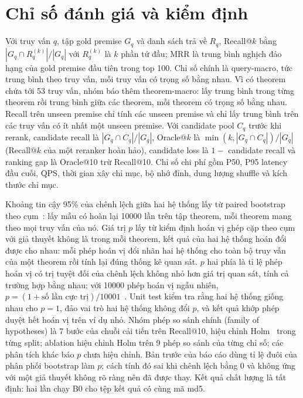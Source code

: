 \documentclass[11pt,a4paper,oneside]{report}
\begin{document}
\section{Chỉ số đánh giá và kiểm định}\label{sec:metrics}

Với truy vấn $q$, tập gold premise $G_q$ và danh sách trả về $R_q$, Recall@$k$ bằng $|G_q \cap R_q^{(k)}| / |G_q|$ với
$R_q^{(k)}$ là $k$ phần tử đầu; MRR là trung bình nghịch đảo hạng của gold premise đầu tiên trong top 100. Chỉ số chính là
query-macro, tức trung bình theo truy vấn, mỗi truy vấn có trọng số bằng nhau. Vì có theorem chứa tới 53 truy vấn, nhóm báo
thêm theorem-macro: lấy trung bình trong từng theorem rồi trung bình giữa các theorem, mỗi theorem có trọng số bằng nhau.
Recall trên unseen premise chỉ tính các unseen premise và chỉ lấy trung bình trên các truy vấn có ít nhất một unseen premise.
Với candidate pool $C_q$ trước khi rerank, candidate recall là $|G_q \cap C_q|/|G_q|$, Oracle@$k$ là
$\min(k, |G_q \cap C_q|)/|G_q|$ (Recall@$k$ của một reranker hoàn hảo), candidate loss là $1 -$ candidate recall và ranking
gap là Oracle@10 trừ Recall@10. Chỉ số chi phí gồm P50, P95 latency đầu cuối, QPS, thời gian xây chỉ mục, bộ nhớ đỉnh, dung
lượng shuffle và kích thước chỉ mục.

Khoảng tin cậy 95\% của chênh lệch giữa hai hệ thống lấy từ paired bootstrap theo cụm~\cite{efron1993}: lấy mẫu có hoàn
lại \num{10000} lần trên tập theorem, mỗi theorem mang theo mọi truy vấn của nó. Giá trị $p$ lấy từ kiểm định hoán vị ghép
cặp theo cụm~\cite{good2005} với giả thuyết không là trong mỗi theorem, kết quả của hai hệ thống hoán đổi được cho nhau: mỗi
phép hoán vị đổi nhãn hai hệ thống cho toàn bộ truy vấn của một theorem rồi tính lại đúng thống kê quan sát. $p$ hai phía là
tỉ lệ phép hoán vị có trị tuyệt đối của chênh lệch không nhỏ hơn giá trị quan sát, tính cả trường hợp bằng nhau; với
\num{10000} phép hoán vị ngẫu nhiên, $p = (1 + \text{số lần cực trị})/\num{10001}$~\cite{phipson2010}. Unit test kiểm tra
rằng hai hệ thống giống nhau cho $p = 1$, đảo vai trò hai hệ thống không đổi $p$, và kết quả khớp phép duyệt hết hoán vị trên
ví dụ nhỏ. Nhóm phép so sánh chính (family of hypotheses) là 7 bước của chuỗi cải tiến trên Recall@10, hiệu chỉnh
Holm~\cite{holm1979} trong từng split;
ablation hiệu chỉnh Holm trên 9 phép so sánh của từng chỉ số; các phân tích khác báo $p$ chưa hiệu chỉnh. Bản trước của báo
cáo dùng tỉ lệ đuôi của phân phối bootstrap làm $p$; cách tính đó sai khi chênh lệch bằng 0 và không ứng với một giả thuyết
không rõ ràng nên đã được thay. Kết quả chất lượng là tất định: hai lần chạy B0 cho tệp kết quả có cùng mã md5.
\end{document}
